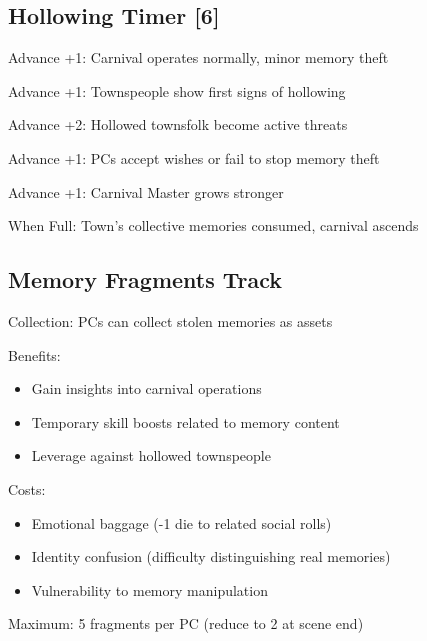 \documentclass[11pt]{article}
\newenvironment{mechanics}{\begin{description}[leftmargin=*,style=standard]}{\end{description}}
\begin{document}
\subsection{Hollowing Timer [6]}
\begin{mechanics}
\item[Advance +1:] Carnival operates normally, minor memory theft
\item[Advance +1:] Townspeople show first signs of hollowing
\item[Advance +2:] Hollowed townsfolk become active threats
\item[Advance +1:] PCs accept wishes or fail to stop memory theft
\item[Advance +1:] Carnival Master grows stronger
\item[When Full:] Town's collective memories consumed, carnival ascends
\end{mechanics}

\subsection{Memory Fragments Track}
\begin{mechanics}
\item[Collection:] PCs can collect stolen memories as assets
\item[Benefits:] 
  \begin{itemize}
    \item Gain insights into carnival operations
    \item Temporary skill boosts related to memory content
    \item Leverage against hollowed townspeople
  \end{itemize}
\item[Costs:] 
  \begin{itemize}
    \item Emotional baggage (-1 die to related social rolls)
    \item Identity confusion (difficulty distinguishing real memories)
    \item Vulnerability to memory manipulation
  \end{itemize}
\item[Maximum:] 5 fragments per PC (reduce to 2 at scene end)
\end{mechanics}
\end{document}
